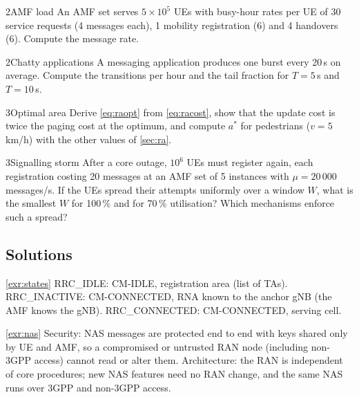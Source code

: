 \documentclass[11pt,a4paper]{article}
\begin{document}
\begin{exercisebox}{2}{AMF load}\label{exr:load}
An AMF set serves $5\times10^{5}$ UEs with busy-hour rates per UE of 30 service requests (4 messages each), 1 mobility registration (6) and 4 handovers (6).
Compute the message rate.
\end{exercisebox}

\begin{exercisebox}{2}{Chatty applications}\label{exr:timer}
A messaging application produces one burst every 20\,s on average. Compute the transitions per hour and the tail fraction for $T = 5$\,s and $T = 10$\,s.
\end{exercisebox}

\begin{exercisebox}{3}{Optimal area}\label{exr:ra}
Derive \cref{eq:raopt} from \cref{eq:racost}, show that the update cost is twice the paging cost at the optimum, and compute $a^{*}$ for pedestrians
($v = 5$\,km/h) with the other values of \cref{sec:ra}.
\end{exercisebox}

\begin{exercisebox}{3}{Signalling storm}\label{exr:storm}
After a core outage, $10^{6}$ UEs must register again, each registration costing 20 messages at an AMF set of 5 instances with $\mu = 20\,000$ messages/s.
If the UEs spread their attempts uniformly over a window $W$, what is the smallest $W$ for 100\,\% and for 70\,\% utilisation? Which mechanisms enforce such a spread?
\end{exercisebox}

\subsection*{Solutions}

\begin{solutionbox}{\ref{exr:states}}
RRC\_IDLE: CM-IDLE, registration area (list of TAs). RRC\_INACTIVE: CM-CONNECTED, RNA known to the anchor gNB (the AMF knows the gNB). RRC\_CONNECTED: CM-CONNECTED,
serving cell.
\end{solutionbox}

\begin{solutionbox}{\ref{exr:nas}}
Security: NAS messages are protected end to end with keys shared only by UE and AMF, so a compromised or untrusted RAN node (including non-3GPP access) cannot read
or alter them. Architecture: the RAN is independent of core procedures; new NAS features need no RAN change, and the same NAS runs over 3GPP and non-3GPP access.
\end{solutionbox}
\end{document}
